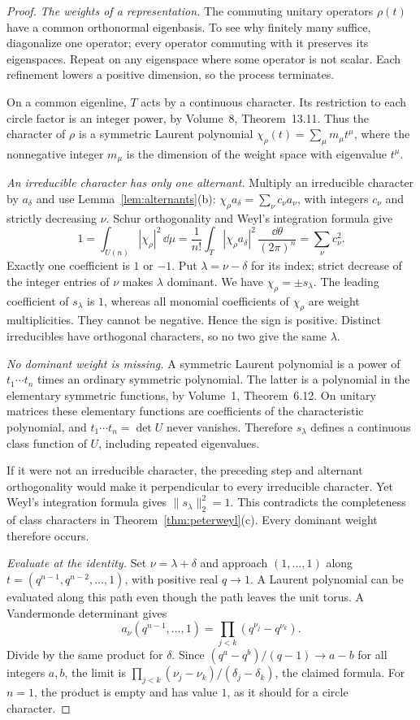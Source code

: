 \begin{proof}
\emph{The weights of a representation.} The commuting unitary operators $\rho(t)$ have a common orthonormal eigenbasis. To see why finitely many suffice, diagonalize one operator; every operator commuting with it preserves its eigenspaces. Repeat on any eigenspace where some operator is not scalar. Each refinement lowers a positive dimension, so the process terminates.

On a common eigenline, $T$ acts by a continuous character. Its restriction to each circle factor is an integer power, by Volume~8, Theorem~13.11. Thus the character of $\rho$ is a symmetric Laurent polynomial
$\chi_\rho(t)=\sum_\mu m_\mu t^\mu$, where the nonnegative integer $m_\mu$ is the dimension of the weight space with eigenvalue $t^\mu$.

\emph{An irreducible character has only one alternant.} Multiply an irreducible character by $a_\delta$ and use Lemma~\ref{lem:alternants}(b):
$\chi_\rho a_\delta=\sum_\nu c_\nu a_\nu$, with integers $c_\nu$ and strictly decreasing $\nu$. Schur orthogonality and Weyl's integration formula give
\[
1=\int_{U(n)}|\chi_\rho|^2\,\dd\mu
=\frac1{n!}\int_T|\chi_\rho a_\delta|^2\,
\frac{\dd\theta}{(2\pi)^n}
=\sum_\nu c_\nu^2.
\]
Exactly one coefficient is $1$ or $-1$. Put $\lambda=\nu-\delta$ for its index; strict decrease of the integer entries of $\nu$ makes $\lambda$ dominant. We have $\chi_\rho=\pm s_\lambda$. The leading coefficient of $s_\lambda$ is $1$, whereas all monomial coefficients of $\chi_\rho$ are weight multiplicities. They cannot be negative. Hence the sign is positive. Distinct irreducibles have orthogonal characters, so no two give the same $\lambda$.

\emph{No dominant weight is missing.} A symmetric Laurent polynomial is a power of $t_1\cdots t_n$ times an ordinary symmetric polynomial. The latter is a polynomial in the elementary symmetric functions, by Volume~1, Theorem~6.12. On unitary matrices these elementary functions are coefficients of the characteristic polynomial, and $t_1\cdots t_n=\det U$ never vanishes. Therefore $s_\lambda$ defines a continuous class function of $U$, including repeated eigenvalues.

If it were not an irreducible character, the preceding step and alternant orthogonality would make it perpendicular to every irreducible character. Yet Weyl's integration formula gives $\|s_\lambda\|_2^2=1$. This contradicts the completeness of class characters in Theorem~\ref{thm:peterweyl}(c). Every dominant weight therefore occurs.

\emph{Evaluate at the identity.} Set $\nu=\lambda+\delta$ and approach $(1,\ldots,1)$ along
$t=(q^{n-1},q^{n-2},\ldots,1)$, with positive real $q\to1$. A Laurent polynomial can be evaluated along this path even though the path leaves the unit torus. A Vandermonde determinant gives
\[
a_\nu(q^{n-1},\ldots,1)
=\prod_{j<k}(q^{\nu_j}-q^{\nu_k}).
\]
Divide by the same product for $\delta$. Since
$(q^a-q^b)/(q-1)\to a-b$ for all integers $a,b$, the limit is
$\prod_{j<k}(\nu_j-\nu_k)/(\delta_j-\delta_k)$, the claimed formula. For $n=1$, the product is empty and has value $1$, as it should for a circle character.
\end{proof}

